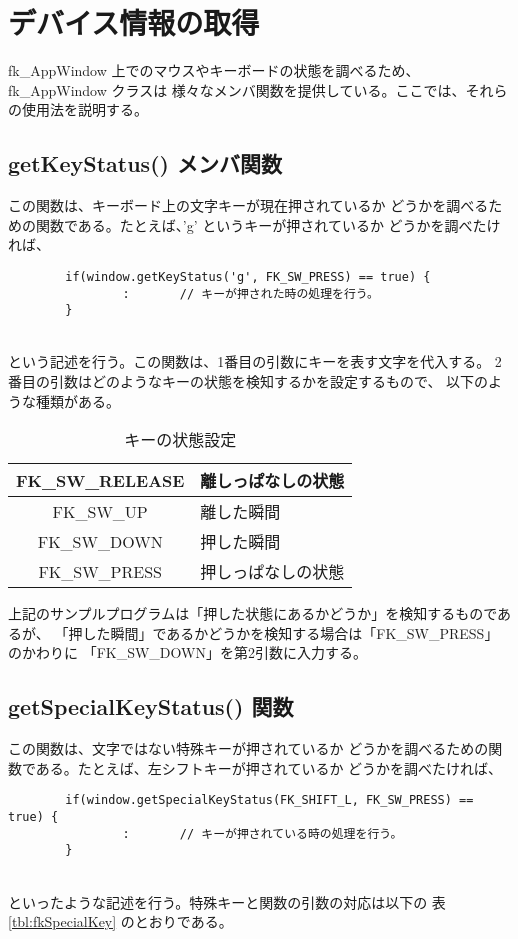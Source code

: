 \section{デバイス情報の取得} \label{sec:device}
fk\_AppWindow 上でのマウスやキーボードの状態を調べるため、fk\_AppWindow クラスは
様々なメンバ関数を提供している。ここでは、それらの使用法を説明する。
\subsection{getKeyStatus() メンバ関数}
この関数は、キーボード上の文字キーが現在押されているか
どうかを調べるための関数である。たとえば、'g' というキーが押されているか
どうかを調べたければ、
\\
\begin{screen}
\begin{verbatim}
        if(window.getKeyStatus('g', FK_SW_PRESS) == true) {
                :       // キーが押された時の処理を行う。
        }
\end{verbatim}
\end{screen}
~ \\
という記述を行う。この関数は、1番目の引数にキーを表す文字を代入する。
2番目の引数はどのようなキーの状態を検知するかを設定するもので、
以下のような種類がある。

\begin{table}[H]
\caption{キーの状態設定}
\label{tbl:fkSwitchStatus}
\begin{center}
\begin{tabular}{|c|l|}
\hline
FK\_SW\_RELEASE & 離しっぱなしの状態 \\ \hline
FK\_SW\_UP & 離した瞬間 \\ \hline
FK\_SW\_DOWN & 押した瞬間 \\ \hline
FK\_SW\_PRESS & 押しっぱなしの状態 \\ \hline
\end{tabular}
\end{center}
\end{table}

上記のサンプルプログラムは「押した状態にあるかどうか」を検知するものであるが、
「押した瞬間」であるかどうかを検知する場合は「FK\_SW\_PRESS」のかわりに
「FK\_SW\_DOWN」を第2引数に入力する。

\subsection{getSpecialKeyStatus() 関数}
この関数は、文字ではない特殊キーが押されているか
どうかを調べるための関数である。たとえば、左シフトキーが押されているか
どうかを調べたければ、
\\
\begin{screen}
\begin{verbatim}
        if(window.getSpecialKeyStatus(FK_SHIFT_L, FK_SW_PRESS) == true) {
                :       // キーが押されている時の処理を行う。
        }
\end{verbatim}
\end{screen}
~ \\
といったような記述を行う。特殊キーと関数の引数の対応は以下の
表 \ref{tbl:fkSpecialKey} のとおりである。

